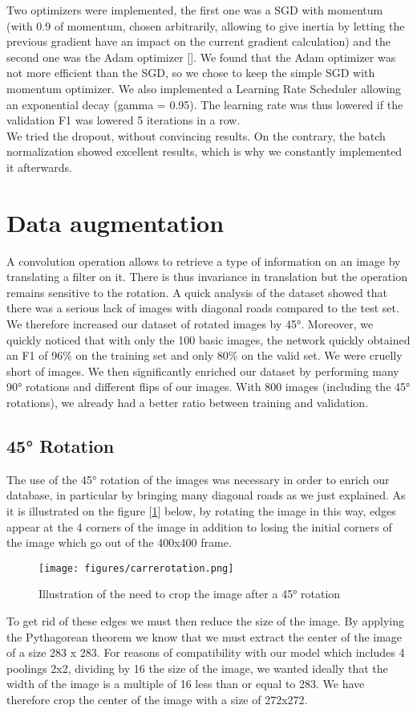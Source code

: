 \documentclass[10pt,conference,compsocconf]{IEEEtran}
\begin{document}
Two optimizers were implemented, the first one was a SGD with momentum (with 0.9 of momentum, chosen arbitrarily, allowing to give inertia by letting the previous gradient have an impact on the current gradient calculation) and the second one was the Adam optimizer [\cite{adam}]. We found that the Adam optimizer was not more efficient than the SGD, so we chose to keep the simple SGD with momentum optimizer.
We also implemented a Learning Rate Scheduler allowing an exponential decay (gamma = 0.95). The learning rate was thus lowered if the validation F1 was lowered 5 iterations in a row. \\
We tried the dropout, without convincing results. On the contrary, the batch normalization showed excellent results, which is why we constantly implemented it afterwards.

\section{Data augmentation}

A convolution operation allows to retrieve a type of information on an image by translating a filter on it. There is thus invariance in translation but the operation remains sensitive to the rotation. A quick analysis of the dataset showed that there was a serious lack of images with diagonal roads compared to the test set. We therefore increased our dataset of rotated images by 45°.
Moreover, we quickly noticed that with only the 100 basic images, the network quickly obtained an F1 of 96$\%$ on the training set and only 80\% on the valid set. We were cruelly short of images. We then significantly enriched our dataset by performing many 90° rotations and different flips of our images. With 800 images (including the 45° rotations), we already had a better ratio between training and validation.

\subsection{45° Rotation}
The use of the 45° rotation of the images was necessary in order to enrich our database, in particular by bringing many diagonal roads as we just explained.
As it is illustrated on the figure [\ref{fig:carrerotation}] below, by rotating the image in this way, edges appear at the 4 corners of the image in addition to losing the initial corners of the image which go out of the 400x400 frame.
\FloatBarrier
\begin{figure}[ht] \centering
    \texttt{[image: figures/carrerotation.png]}
    \caption{Illustration of the need to crop the image after a 45° rotation}
    \label{fig:carrerotation}
\end{figure}
\FloatBarrier
To get rid of these edges we must then reduce the size of the image. By applying the Pythagorean theorem we know that we must extract the center of the image of a size 283 x 283. For reasons of compatibility with our model which includes 4 poolings 2x2, dividing by 16 the size of the image, we wanted ideally that the width of the image is a multiple of 16 less than or equal to 283. We have therefore crop the center of the image with a size of 272x272.
\end{document}
